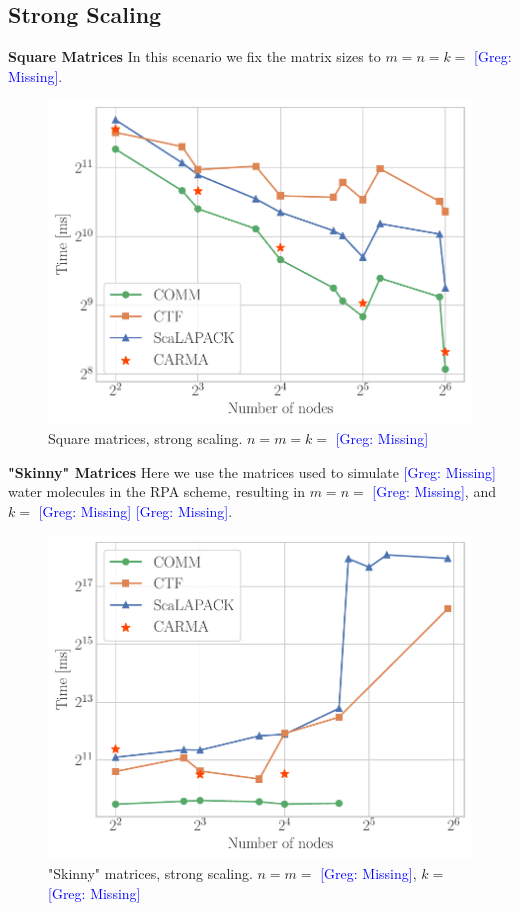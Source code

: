 \documentclass[sigplan,review,anonymous,10pt]{acmart}\settopmatter{printfolios=true,printccs=false,printacmref=false}
\newcommand\greg[1]{\textcolor{blue}{[Greg: #1]}}
\newcommand{\macb}[1]{\textbf{\textsf{#1}}}
\begin{document}
\subsection{Strong Scaling}
\macb{Square Matrices} In this scenario we fix the matrix sizes to $m=n=k=$ 
\greg{Missing}. 
\begin{figure}
	\includegraphics[width=\columnwidth]{results/square_strong_scaling}
	\caption{Square matrices, strong scaling. $n=m=k=$ \greg{Missing}} 
	\label{fig:mmmParallelization}
\end{figure}

\noindent
\macb{"Skinny" Matrices} Here we use the matrices used to simulate 
\greg{Missing} water molecules in the RPA scheme, resulting in $m=n=$ 
\greg{Missing}, and $k=$ \greg{Missing} 
\greg{Missing}. 
\begin{figure}
	\includegraphics[width=\columnwidth]{results/thin_strong_scaling}
	\caption{"Skinny" matrices, strong scaling. $n=m=$ \greg{Missing}, $k=$ 
	\greg{Missing}} 
	\label{fig:mmmParallelization}
\end{figure}
\end{document}
